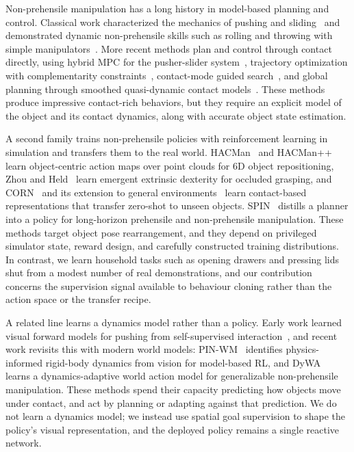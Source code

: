 \documentclass[letterpaper, 10 pt, conference]{ieeeconf}  %
\begin{document}
Non-prehensile manipulation has a long history in model-based planning and control.
Classical work characterized the mechanics of pushing and sliding~\cite{mason1986pushing, lynch1996stable, goyal1991limitsurface} and demonstrated dynamic non-prehensile skills such as rolling and throwing with simple manipulators~\cite{lynch1999dynamic}.
More recent methods plan and control through contact directly, using hybrid MPC for the pusher-slider system~\cite{hogan2020reactive}, trajectory optimization with complementarity constraints~\cite{moura2022nonprehensile}, contact-mode guided search~\cite{cheng2022contactmode}, and global planning through smoothed quasi-dynamic contact models~\cite{pang2023global, suh2025contacttrustregion}.
These methods produce impressive contact-rich behaviors, but they require an explicit model of the object and its contact dynamics, along with accurate object state estimation.

A second family trains non-prehensile policies with reinforcement learning in simulation and transfers them to the real world.
HACMan~\cite{zhou2023hacman} and HACMan++~\cite{jiang2024hacmanpp} learn object-centric action maps over point clouds for 6D object repositioning, Zhou and Held~\cite{zhou2022ungraspable} learn emergent extrinsic dexterity for occluded grasping, and CORN~\cite{cho2024corn} and its extension to general environments~\cite{kim2025general} learn contact-based representations that transfer zero-shot to unseen objects.
SPIN~\cite{jung2025spin} distills a planner into a policy for long-horizon prehensile and non-prehensile manipulation.
These methods target object pose rearrangement, and they depend on privileged simulator state, reward design, and carefully constructed training distributions.
In contrast, we learn household tasks such as opening drawers and pressing lids shut from a modest number of real demonstrations, and our contribution concerns the supervision signal available to behaviour cloning rather than the action space or the transfer recipe.

A related line learns a dynamics model rather than a policy.
Early work learned visual forward models for pushing from self-supervised interaction~\cite{agrawal2016poking, finn2017foresight}, and recent work revisits this with modern world models: PIN-WM~\cite{pinwm2025} identifies physics-informed rigid-body dynamics from vision for model-based RL, and DyWA~\cite{lyu2025dywa} learns a dynamics-adaptive world action model for generalizable non-prehensile manipulation.
These methods spend their capacity predicting how objects move under contact, and act by planning or adapting against that prediction.
We do not learn a dynamics model; we instead use spatial goal supervision to shape the policy's visual representation, and the deployed policy remains a single reactive network.
\end{document}
